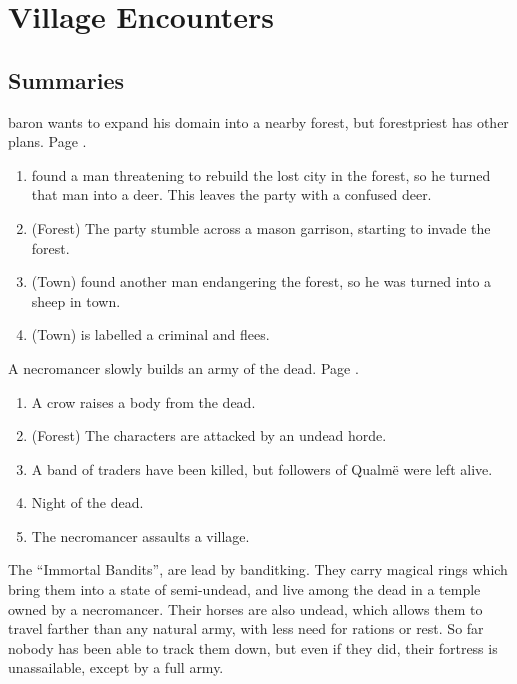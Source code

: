 \chapter{Village Encounters}

\setcounter{encnum}{1}

\section{Summaries}

\begin{multicols}{2}


\gls{baron} wants to expand his domain into a nearby forest, but \gls{forestpriest} has other plans.
Page \pageref{herenofarther}.

\begin{enumerate}
	\item{ found a man threatening to rebuild the lost city in the forest, so he turned that man into a deer. This leaves the party with a confused deer.}
	\item{(Forest) The party stumble across a mason garrison, starting to invade the forest.}
	\item{(Town)  found another man endangering the forest, so he was turned into a sheep in town.}
	\item{(Town)  is labelled a criminal and flees.}
\end{enumerate}

A necromancer slowly builds an army of the dead.
Page \pageref{necromancerspet}.

\begin{enumerate}
	\item{A crow raises a body from the dead.}
	\item{(Forest) The characters are attacked by an undead horde.}
	\item{A band of traders have been killed, but followers of Qualm\"{e} were left alive.}
	\item{Night of the dead.}
	\item{ The necromancer assaults a village.}
\end{enumerate}


The ``Immortal Bandits'', are lead by \gls{banditking}.
They carry magical rings which bring them into a state of semi-undead, and live among the dead in a temple owned by a necromancer.
Their horses are also undead, which allows them to travel farther than any natural army, with less need for rations or rest.
So far nobody has been able to track them down, but even if they did, their fortress is unassailable, except by a full army.


\end{multicols}
